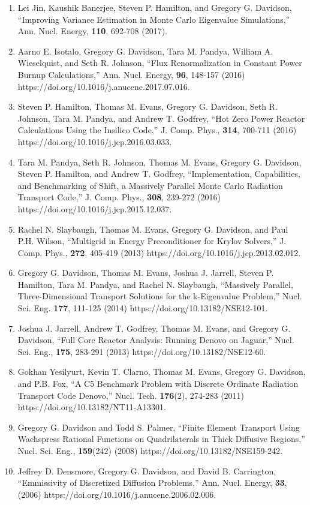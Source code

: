 \documentclass[letterpaper,11pt]{article}
\begin{document}
\begin{enumerate}
    (2018) https://doi.org/10.1016/j.anucene.2018.04.039.
  \item Lei Jin, Kaushik Banerjee, Steven P. Hamilton, and Gregory
    G. Davidson, ``Improving Variance Estimation in Monte Carlo
    Eigenvalue Simulations,'' Ann. Nucl. Energy, \textbf{110}, 692-708
    (2017). 
  \item Aarno E. Isotalo, Gregory G. Davidson, Tara M. Pandya, William
    A. Wieselquist, and Seth R. Johnson, ``Flux Renormalization in
    Constant Power Burnup Calculations,'' Ann. Nucl. Energy,
    \textbf{96}, 148-157 (2016)
    https://doi.org/10.1016/j.anucene.2017.07.016.
  \item Steven P. Hamilton, Thomas M. Evans, Gregory G. Davidson, Seth
    R. Johnson, Tara M. Pandya, and Andrew T. Godfrey, ``Hot Zero
    Power Reactor Calculations Using the Insilico Code,''
    J. Comp. Phys., \textbf{314}, 700-711 (2016)
    https://doi.org/10.1016/j.jcp.2016.03.033.
  \item Tara M. Pandya, Seth R. Johnson, Thomas M. Evans, Gregory
    G. Davidson, Steven P. Hamilton, and Andrew T. Godfrey,
    ``Implementation, Capabilities, and Benchmarking of Shift, a
    Massively Parallel Monte Carlo Radiation Transport Code,''
    J. Comp. Phys., \textbf{308}, 239-272 (2016)
    https://doi.org/10.1016/j.jcp.2015.12.037.
  \item Rachel N. Slaybaugh, Thomas M. Evans, Gregory G. Davidson, and
    Paul P.H. Wilson, ``Multigrid in Energy Preconditioner for Krylov
    Solvers,'' J. Comp. Phys., \textbf{272}, 405-419 (2013)
    https://doi.org/10.1016/j.jcp.2013.02.012.
  \item Gregory G. Davidson, Thomas M. Evans, Joshua J. Jarrell,
    Steven P. Hamilton, Tara M. Pandya, and Rachel N. Slaybaugh, ``Massively
    Parallel, Three-Dimensional Transport Solutions for the
    k-Eigenvalue Problem,'' Nucl. Sci. Eng. \textbf{177}, 111-125
    (2014) https://doi.org/10.13182/NSE12-101.
  \item Joshua J. Jarrell, Andrew T. Godfrey, Thomas M. Evans, and
    Gregory G. Davidson, ``Full Core Reactor Analysis: Running Denovo
    on Jaguar,'' Nucl. Sci. Eng., \textbf{175}, 283-291 (2013)
    https://doi.org/10.13182/NSE12-60.
  \item Gokhan Yesilyurt, Kevin T. Clarno, Thomas M. Evans, Gregory
    G. Davidson, and P.B. Fox, ``A C5 Benchmark Problem with Discrete
    Ordinate Radiation Transport Code Denovo,''
    Nucl. Tech. \textbf{176}(2), 274-283 (2011)
    https://doi.org/10.13182/NT11-A13301.
  \item Gregory G. Davidson and Todd S. Palmer, ``Finite Element
    Transport Using Wachspress Rational Functions on Quadrilaterals in
    Thick Diffusive Regions,'' Nucl. Sci. Eng., \textbf{159}(242)
    (2008) https://doi.org/10.13182/NSE159-242.
  \item Jeffrey D. Densmore, Gregory G. Davidson, and David
    B. Carrington, ``Emmissivity of Discretized Diffusion Problems,''
    Ann. Nucl. Energy, \textbf{33}, (2006)
    https://doi.org/10.1016/j.anucene.2006.02.006.
\end{enumerate}
\end{document}

